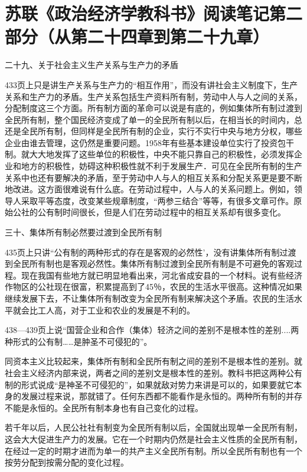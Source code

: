 \section[苏联《政治经济学教科书》阅读笔记第二部分（从第二十四章到第二十九章）]{苏联《政治经济学教科书》阅读笔记第二部分（从第二十四章到第二十九章）}


二十九、关于社会主义生产关系与生产力的矛盾

433页上只是讲生产关系与生产力的“相互作用”，而没有讲社会主义制度下，生产关系和生产力的矛盾。生产关系包括生产资料所有制，劳动中人与人之间的关系，分配制度这三个方面。所有制方面的革命可以说是有底的，例如集体所有制过渡到全民所有制，整个国民经济变成了单一的全民所有制以后，在相当长的时间内，总还是全民所有制，但同样是全民所有制的企业，实行不实行中央与地方分权，哪些企业由谁去管理，这仍然是重要问题。1958年有些基本建设单位实行了投资包干制。就大大地发挥了这些单位的积极性，中央不能只靠自己的积极性，必须发挥企业和地方的积极性，妨碍这种积极性就不利于发展生产．可见在全民所有制的生产关系中也还有要解决的矛盾，至于劳动中人与人的相互关系和分配关系更是要不断地改进。这方面很难说有什么底。在劳动过程中，人与人的关系问题上。例如，领导人采取平等态度，改变某些规章制度，“两参三结合”等等，有很多文章可作。原始公社的公有制时间很长，但是人们在劳动过程中的相互关系却有很多变化。

三十、集体所有制必然要过渡到全民所有制

435页上只讲“公有制的两种形式的存在是客观的必然性’，没有讲集体所有制过渡到全民所有制也是客观必然性。集体所有制过渡到全民所有制是不可避免的客观过程。现在我国有些地方就已明显地看出来，河北省成安县的一个材料。说有些经济作物区的公社现在很富，积累提高到了45％，农民的生活水平很高。这种情况如果继续发展下去，不让集体所有制改变为全民所有制来解决这个矛盾。农民的生活水平就会比工人高，对于工业和农业的发展是不利的。

438—439页上说“国营企业和合作（集体）轻济之间的差别不是根本性的差别....两种形式的公有制……是肿圣不可侵犯的”。

同资本主义比较起来，集体所有制和全民所有制之间的差别不是根本性的差别。就社会主义经济内部来说，两者之间的差别文是根本性的差别。教科书把这两种公有制的形式说成“是神圣不可侵犯的”，如果就敌对势力来讲是可以的，如果要就它本身的发展过程来说，那就错了。任何东西都不能看作是永恒的。两种所有制的并存不能是永恒的。全民所有制本身也有自己变化的过程。

若千年以后，人民公社社有制变为全民所有制以后，全国就出现单一全民所有制，这会大大促进生产力的发展。它在一个时期内仍然是社会主义性质的全民所有制，在经过一定的时期才进而为单一的共产主义全民所有制。所以全民所有制也有一个按劳分配到按需分配的变化过程。

